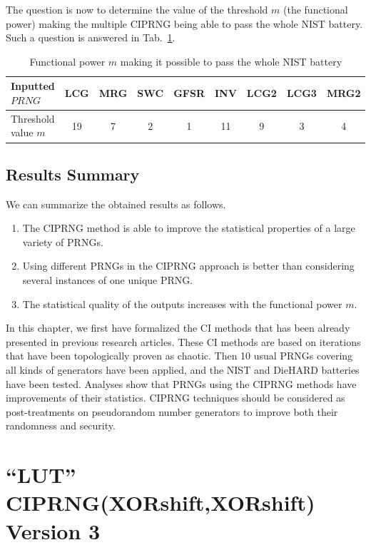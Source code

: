The question is now to determine the value of the threshold $m$ (the functional power) making 
the multiple CIPRNG being able to pass the whole NIST battery.
Such a question is answered in Tab.~\ref{threshold}.


\begin{table}
\renewcommand{\arraystretch}{1.3}
\caption{Functional power $m$ making it possible to pass the whole NIST battery}
\label{threshold}
\centering
  \begin{tabular}{|l||c|c|c|c|c|c|c|c|}
    \hline
Inputted $PRNG$ & LCG & MRG & SWC & GFSR & INV& LCG2 & LCG3  & MRG2 \\ \hline\hline
Threshold  value $m$& 19 & 7  & 2& 1 & 11& 9& 3& 4\\ \hline\hline
\end{tabular}
\end{table}

\subsection{Results Summary}

We can summarize the obtained results as follows.
\begin{enumerate}
\item The CIPRNG method is able to improve the statistical properties of a large variety of PRNGs.
\item Using different PRNGs in the CIPRNG approach is better than considering several instances of one unique PRNG.
\item The statistical quality of the outputs increases with the functional power $m$.
\end{enumerate}

In this chapter, we first have formalized the CI methods that has been already presented in previous research articles.
These CI methods are based on iterations that have been topologically proven as chaotic.
Then 10 usual PRNGs covering all kinds of generators have been applied, and the NIST and DieHARD batteries have been tested.
Analyses show that PRNGs using the CIPRNG methods have improvements of their statistics.
CIPRNG techniques should be considered as post-treatments on pseudorandom number generators to improve both their randomness and security.


\section{``LUT'' CIPRNG(XORshift,XORshift) Version 3}
\label{LUT CI(XORshift,XORshift) algorithms and example}
